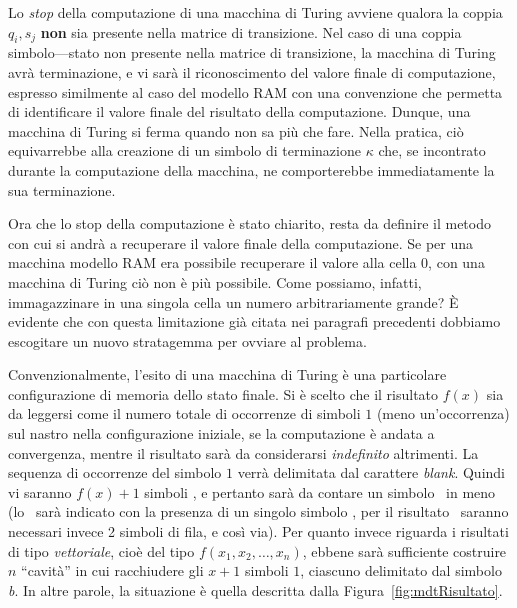\documentclass[10pt]{\classname}
\theoremstyle{definition}
\theoremstyle{definition}
\begin{document}
Lo \emph{stop} della computazione di una macchina di Turing avviene qualora la
coppia $q_i, s_j$ \textbf{non} sia presente nella matrice di transizione. Nel
caso di una coppia simbolo---stato non presente nella matrice di transizione,
la macchina di Turing avrà terminazione, e vi sarà il riconoscimento del valore
finale di computazione, espresso similmente al caso del modello RAM con una
convenzione che permetta di identificare il valore finale del risultato della
computazione. Dunque, una macchina di Turing si ferma quando non sa più che
fare. Nella pratica, ciò equivarrebbe alla creazione di un simbolo di
terminazione $\kappa$ che, se incontrato durante la computazione della
macchina, ne comporterebbe immediatamente la sua terminazione.

Ora che lo stop della computazione è stato chiarito, resta da definire il metodo
con cui si andrà a recuperare il valore finale della computazione. Se per una
macchina modello RAM era possibile recuperare il valore alla cella 0, con una
macchina di Turing ciò non è più possibile. Come possiamo, infatti,
immagazzinare in una singola cella un numero arbitrariamente grande? È evidente
che con questa limitazione già citata nei paragrafi precedenti dobbiamo
escogitare un nuovo stratagemma per ovviare al problema.

Convenzionalmente, l'esito di una macchina di Turing è una particolare
configurazione di memoria dello stato finale. Si è scelto che
il risultato $f(x)$ sia da leggersi come il numero totale di occorrenze di simboli $1$
(meno un'occorrenza) sul nastro nella configurazione iniziale, se la computazione è
andata a convergenza, mentre il risultato sarà da considerarsi \emph{indefinito}
altrimenti. La sequenza di occorrenze del simbolo $1$ verrà delimitata dal
carattere \emph{blank}. Quindi vi saranno $f(x) + 1$ simboli
\textquotesingle, e pertanto sarà da contare un simbolo
\textquotesingle\ in meno (lo
\textquotesingle\   sarà indicato con la presenza di un
singolo simbolo \textquotesingle, per il risultato
\textquotesingle\ saranno necessari invece 2 simboli
\textquotesingle di fila, e così via). Per quanto invece
riguarda i risultati di tipo \emph{vettoriale}, cioè del tipo
$f(x_1,x_2,\dots,x_n)$, ebbene sarà sufficiente costruire $n$ ``cavità'' in
cui racchiudere gli $x+1$ simboli $1$, ciascuno delimitato dal simbolo
\emph{b}. In altre parole, la situazione è quella descritta dalla
Figura~\ref{fig:mdtRisultato}.
\end{document}
